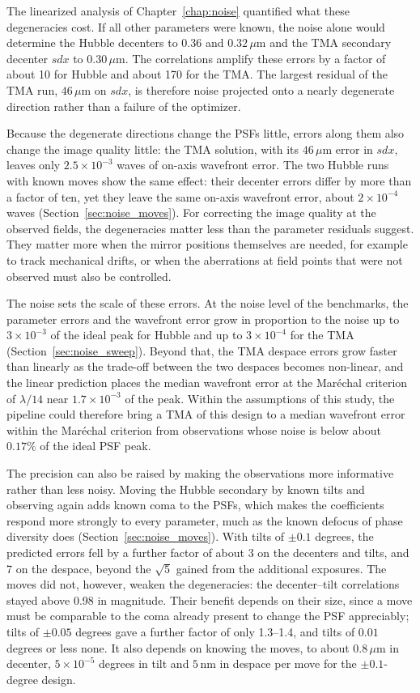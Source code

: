 The linearized analysis of Chapter~\ref{chap:noise} quantified what these degeneracies cost. If all other parameters were known, the noise alone would determine the Hubble decenters to $0.36$ and $0.32\,\mu\mathrm{m}$ and the TMA secondary decenter $sdx$ to $0.30\,\mu\mathrm{m}$. The correlations amplify these errors by a factor of about 10 for Hubble and about 170 for the TMA. The largest residual of the TMA run, $46\,\mu\mathrm{m}$ on $sdx$, is therefore noise projected onto a nearly degenerate direction rather than a failure of the optimizer.

Because the degenerate directions change the PSFs little, errors along them also change the image quality little: the TMA solution, with its $46\,\mu\mathrm{m}$ error in $sdx$, leaves only $2.5\times10^{-3}$ waves of on-axis wavefront error. The two Hubble runs with known moves show the same effect: their decenter errors differ by more than a factor of ten, yet they leave the same on-axis wavefront error, about $2\times10^{-4}$ waves (Section~\ref{sec:noise_moves}). For correcting the image quality at the observed fields, the degeneracies matter less than the parameter residuals suggest. They matter more when the mirror positions themselves are needed, for example to track mechanical drifts, or when the aberrations at field points that were not observed must also be controlled.

The noise sets the scale of these errors. At the noise level of the benchmarks, the parameter errors and the wavefront error grow in proportion to the noise up to $3\times10^{-3}$ of the ideal peak for Hubble and up to $3\times10^{-4}$ for the TMA (Section~\ref{sec:noise_sweep}). Beyond that, the TMA despace errors grow faster than linearly as the trade-off between the two despaces becomes non-linear, and the linear prediction places the median wavefront error at the Mar{\'e}chal criterion of $\lambda/14$ near $1.7\times10^{-3}$ of the peak. Within the assumptions of this study, the pipeline could therefore bring a TMA of this design to a median wavefront error within the Mar{\'e}chal criterion from observations whose noise is below about $0.17\%$ of the ideal PSF peak.

The precision can also be raised by making the observations more informative rather than less noisy. Moving the Hubble secondary by known tilts and observing again adds known coma to the PSFs, which makes the coefficients respond more strongly to every parameter, much as the known defocus of phase diversity does (Section~\ref{sec:noise_moves}). With tilts of $\pm0.1$ degrees, the predicted errors fell by a further factor of about 3 on the decenters and tilts, and 7 on the despace, beyond the $\sqrt{5}$ gained from the additional exposures. The moves did not, however, weaken the degeneracies: the decenter--tilt correlations stayed above 0.98 in magnitude. Their benefit depends on their size, since a move must be comparable to the coma already present to change the PSF appreciably; tilts of $\pm0.05$ degrees gave a further factor of only 1.3--1.4, and tilts of $0.01$ degrees or less none. It also depends on knowing the moves, to about $0.8\,\mu\mathrm{m}$ in decenter, $5\times10^{-5}$ degrees in tilt and $5$\,nm in despace per move for the $\pm0.1$-degree design.

